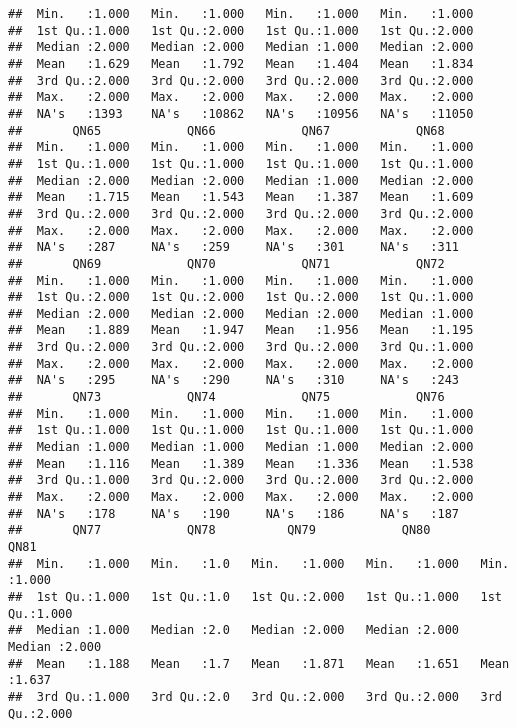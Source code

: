 \documentclass[
]{article}
\begin{document}
\begin{verbatim}
##  Min.   :1.000   Min.   :1.000   Min.   :1.000   Min.   :1.000  
##  1st Qu.:1.000   1st Qu.:2.000   1st Qu.:1.000   1st Qu.:2.000  
##  Median :2.000   Median :2.000   Median :1.000   Median :2.000  
##  Mean   :1.629   Mean   :1.792   Mean   :1.404   Mean   :1.834  
##  3rd Qu.:2.000   3rd Qu.:2.000   3rd Qu.:2.000   3rd Qu.:2.000  
##  Max.   :2.000   Max.   :2.000   Max.   :2.000   Max.   :2.000  
##  NA's   :1393    NA's   :10862   NA's   :10956   NA's   :11050  
##       QN65            QN66            QN67            QN68      
##  Min.   :1.000   Min.   :1.000   Min.   :1.000   Min.   :1.000  
##  1st Qu.:1.000   1st Qu.:1.000   1st Qu.:1.000   1st Qu.:1.000  
##  Median :2.000   Median :2.000   Median :1.000   Median :2.000  
##  Mean   :1.715   Mean   :1.543   Mean   :1.387   Mean   :1.609  
##  3rd Qu.:2.000   3rd Qu.:2.000   3rd Qu.:2.000   3rd Qu.:2.000  
##  Max.   :2.000   Max.   :2.000   Max.   :2.000   Max.   :2.000  
##  NA's   :287     NA's   :259     NA's   :301     NA's   :311    
##       QN69            QN70            QN71            QN72      
##  Min.   :1.000   Min.   :1.000   Min.   :1.000   Min.   :1.000  
##  1st Qu.:2.000   1st Qu.:2.000   1st Qu.:2.000   1st Qu.:1.000  
##  Median :2.000   Median :2.000   Median :2.000   Median :1.000  
##  Mean   :1.889   Mean   :1.947   Mean   :1.956   Mean   :1.195  
##  3rd Qu.:2.000   3rd Qu.:2.000   3rd Qu.:2.000   3rd Qu.:1.000  
##  Max.   :2.000   Max.   :2.000   Max.   :2.000   Max.   :2.000  
##  NA's   :295     NA's   :290     NA's   :310     NA's   :243    
##       QN73            QN74            QN75            QN76      
##  Min.   :1.000   Min.   :1.000   Min.   :1.000   Min.   :1.000  
##  1st Qu.:1.000   1st Qu.:1.000   1st Qu.:1.000   1st Qu.:1.000  
##  Median :1.000   Median :1.000   Median :1.000   Median :2.000  
##  Mean   :1.116   Mean   :1.389   Mean   :1.336   Mean   :1.538  
##  3rd Qu.:1.000   3rd Qu.:2.000   3rd Qu.:2.000   3rd Qu.:2.000  
##  Max.   :2.000   Max.   :2.000   Max.   :2.000   Max.   :2.000  
##  NA's   :178     NA's   :190     NA's   :186     NA's   :187    
##       QN77            QN78          QN79            QN80            QN81      
##  Min.   :1.000   Min.   :1.0   Min.   :1.000   Min.   :1.000   Min.   :1.000  
##  1st Qu.:1.000   1st Qu.:1.0   1st Qu.:2.000   1st Qu.:1.000   1st Qu.:1.000  
##  Median :1.000   Median :2.0   Median :2.000   Median :2.000   Median :2.000  
##  Mean   :1.188   Mean   :1.7   Mean   :1.871   Mean   :1.651   Mean   :1.637  
##  3rd Qu.:1.000   3rd Qu.:2.0   3rd Qu.:2.000   3rd Qu.:2.000   3rd Qu.:2.000  

\end{verbatim}
\end{document}
